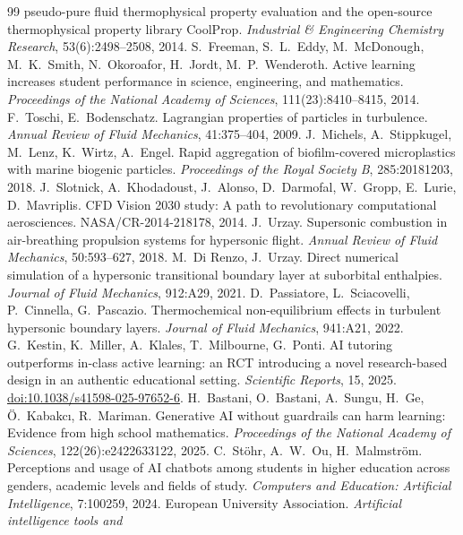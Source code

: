 \documentclass[11pt]{article}
\begin{document}
\begin{thebibliography}{99}
pseudo-pure fluid thermophysical property evaluation and the open-source thermophysical
property library CoolProp. \emph{Industrial \& Engineering Chemistry Research},
53(6):2498--2508, 2014.
 S.\ Freeman, S.\ L.\ Eddy, M.\ McDonough, M.\ K.\ Smith, N.\ Okoroafor,
H.\ Jordt, M.\ P.\ Wenderoth. Active learning increases student performance in science,
engineering, and mathematics. \emph{Proceedings of the National Academy of Sciences},
111(23):8410--8415, 2014.
 F.\ Toschi, E.\ Bodenschatz. Lagrangian properties of particles in
turbulence. \emph{Annual Review of Fluid Mechanics}, 41:375--404, 2009.
 J.\ Michels, A.\ Stippkugel, M.\ Lenz, K.\ Wirtz, A.\ Engel. Rapid
aggregation of biofilm-covered microplastics with marine biogenic particles.
\emph{Proceedings of the Royal Society B}, 285:20181203, 2018.
 J.\ Slotnick, A.\ Khodadoust, J.\ Alonso, D.\ Darmofal, W.\ Gropp,
E.\ Lurie, D.\ Mavriplis. CFD Vision 2030 study: A path to revolutionary computational
aerosciences. NASA/CR-2014-218178, 2014.
 J.\ Urzay. Supersonic combustion in air-breathing propulsion systems for
hypersonic flight. \emph{Annual Review of Fluid Mechanics}, 50:593--627, 2018.
 M.\ Di Renzo, J.\ Urzay. Direct numerical simulation of a
hypersonic transitional boundary layer at suborbital enthalpies. \emph{Journal of Fluid
Mechanics}, 912:A29, 2021.
 D.\ Passiatore, L.\ Sciacovelli, P.\ Cinnella, G.\ Pascazio.
Thermochemical non-equilibrium effects in turbulent hypersonic boundary layers.
\emph{Journal of Fluid Mechanics}, 941:A21, 2022.
 G.\ Kestin, K.\ Miller, A.\ Klales, T.\ Milbourne, G.\ Ponti. AI tutoring
outperforms in-class active learning: an RCT introducing a novel research-based design in an
authentic educational setting. \emph{Scientific Reports}, 15, 2025.
\href{https://doi.org/10.1038/s41598-025-97652-6}{doi:10.1038/s41598-025-97652-6}.
 H.\ Bastani, O.\ Bastani, A.\ Sungu, H.\ Ge, \"O.\ Kabakc\i{}, R.\
Mariman. Generative AI without guardrails can harm learning: Evidence from high school
mathematics. \emph{Proceedings of the National Academy of Sciences}, 122(26):e2422633122,
2025.
 C.\ St\"ohr, A.\ W.\ Ou, H.\ Malmstr\"om. Perceptions and usage of AI
chatbots among students in higher education across genders, academic levels and fields of
study. \emph{Computers and Education: Artificial Intelligence}, 7:100259, 2024.
\bibitem{EUA2023} European University Association. \emph{Artificial intelligence tools and
}
\end{thebibliography}
\end{document}
